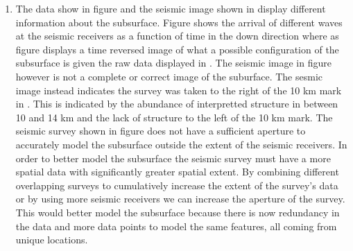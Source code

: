 \begin{enumerate}
\item The data show in figure  and the seismic image shown in  display different information about the subsurface. Figure  shows the arrival of different waves at the seismic receivers as a function of time in the down direction where as figure  displays a time reversed image of what a possible configuration of the subsurface is given the raw data displayed in . The seismic image in figure  however is not a complete or correct image of the suburface. The sesmic image instead indicates the survey was taken to the right of the 10 km mark in . This is indicated by the abundance of interpretted structure in between 10 and 14 km and the lack of structure to the left of the 10 km mark. The seismic survey shown in figure  does not have a sufficient aperture to accurately model the subsurface outside the extent of the seismic receivers. In order to better model the subsurface the seismic survey must have a more spatial data with significantly greater spatial extent. By combining different overlapping surveys to cumulatively increase the extent of the survey's data or by using more seismic receivers we can increase the aperture of the survey. This would better model the subsurface because there is now redundancy in the data and more data points to model the same features, all coming from unique locations.  
\end{enumerate}
